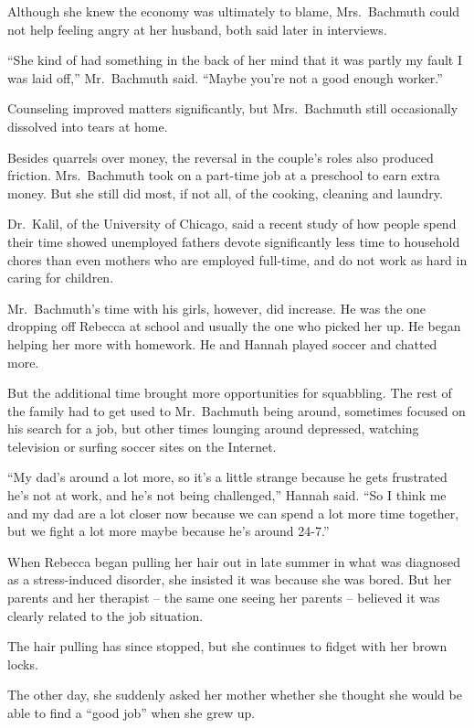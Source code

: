 ﻿\documentclass[12pt]{article}
\begin{document}
Although she knew the economy was ultimately to blame, Mrs.~Bachmuth could not help feeling angry at
her husband, both said later in interviews.

``She kind of had something in the back of her mind that it was partly my fault I was laid off,''
Mr.~Bachmuth said. ``Maybe you're not a good enough worker.''

Counseling improved matters significantly, but Mrs.~Bachmuth still occasionally dissolved into tears
at home.

Besides quarrels over money, the reversal in the couple's roles also produced friction.
Mrs.~Bachmuth took on a part-time job at a preschool to earn extra money. But she still did most, if
not all, of the cooking, cleaning and laundry.

Dr.~Kalil, of the University of Chicago, said a recent study of how people spend their time showed
unemployed fathers devote significantly less time to household chores than even mothers who are
employed full-time, and do not work as hard in caring for children.

Mr.~Bachmuth's time with his girls, however, did increase. He was the one dropping off Rebecca at
school and usually the one who picked her up. He began helping her more with homework. He and Hannah
played soccer and chatted more.

But the additional time brought more opportunities for squabbling. The rest of the family had to get
used to Mr.~Bachmuth being around, sometimes focused on his search for a job, but other times
lounging around depressed, watching television or surfing soccer sites on the Internet.

``My dad's around a lot more, so it's a little strange because he gets frustrated he's not at work,
and he's not being challenged,'' Hannah said. ``So I think me and my dad are a lot closer now
because we can spend a lot more time together, but we fight a lot more maybe because he's around
24-7.''

When Rebecca began pulling her hair out in late summer in what was diagnosed as a stress-induced
disorder, she insisted it was because she was bored. But her parents and her therapist -- the same
one seeing her parents -- believed it was clearly related to the job situation.

The hair pulling has since stopped, but she continues to fidget with her brown locks.

The other day, she suddenly asked her mother whether she thought she would be able to find a ``good
job'' when she grew up.
\end{document}
